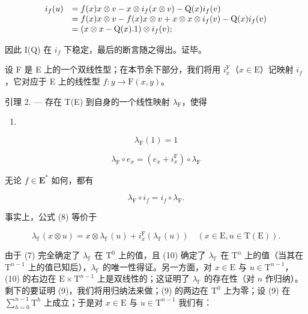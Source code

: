 \[
\begin{array}{r l} i _ {f} (u) & = f (x) x \otimes v - x \otimes i _ {f} (x \otimes v) - \mathrm{Q} (x) i _ {f} (v) \\ & = f (x) x \otimes v - f (x) x \otimes v + x \otimes x \otimes i _ {f} (v) - \mathrm{Q} (x) i _ {f} (v) \\ & = (x \otimes x - \mathrm{Q} (x). 1) \otimes i _ {f} (v); \end{array}
\]

  因此 I(Q) 在 \(i_{f}\) 下稳定，最后的断言随之得出。证毕。

  设 F 是 E 上的一个双线性型；在本节余下部分，我们将用 \(i_x^{\mathrm{F}}\)（\(x \in \mathrm{E}\)）记映射 \(i_f\)，它对应于 E 上的线性型 \(f: y \to \mathrm{F}(x, y)\)。

引理 2. --- 存在 T(E) 到自身的一个线性映射 \(\lambda_{\mathrm{F}}\)，使得

\begin{enumerate}
\def\labelenumi{(\arabic{enumi})}
\setcounter{enumi}{6}
\tightlist
\item
\end{enumerate}

\[
\lambda_ {\mathrm{F}} (1) = 1\tag{8}
\]

\[
\lambda_ {\mathrm{F}} \circ e _ {x} = (e _ {x} + i _ {x} ^ {\mathrm{F}}) \circ \lambda_ {\mathrm{F}}\tag{\( (x \in E) \) .}
\]

  无论 \(f \in \mathbf{E}^*\) 如何，都有

\[
\lambda_ {\mathrm{F}} \circ i _ {f} = i _ {f} \circ \lambda_ {\mathrm{F}}.\tag{9}
\]

  事实上，公式 (8) 等价于

\[
\lambda_ {\mathbb {F}} (x \otimes u) = x \otimes \lambda_ {\mathbb {F}} (u) + i _ {x} ^ {\mathrm{F}} (\lambda_ {\mathbb {F}} (u)) \quad (x \in \mathrm{E}, u \in \mathrm{T} (\mathrm{E})).\tag{10}
\]

  由于 (7) 完全确定了 \(\lambda_{\mathbb{F}}\) 在 \(\mathrm{T}^{0}\) 上的值，且 (10) 确定了 \(\lambda_{\mathbb{F}}\) 在 \(\mathrm{T}^{n}\) 上的值（当其在 \(\mathrm{T}^{n-1}\) 上的值已知后），\(\lambda_{\mathbb{F}}\) 的唯一性得证。另一方面，对 \(x \in \mathrm{E}\) 与 \(u \in \mathrm{T}^{n-1}\)，(10) 的右边在 \(\mathrm{E} \times \mathrm{T}^{n-1}\) 上是双线性的；这证明了 \(\lambda_{\mathbb{F}}\) 的存在性（对 \(n\) 作归纳）。剩下的要证明 (9)，我们将用归纳法来做；(9) 的两边在 \(\mathrm{T}^{0}\) 上为零；设 (9) 在 \(\sum_{h=0}^{n-1} \mathrm{T}^{h}\) 上成立；于是对 \(x \in \mathrm{E}\) 与 \(u \in \mathrm{T}^{n-1}\) 我们有：

